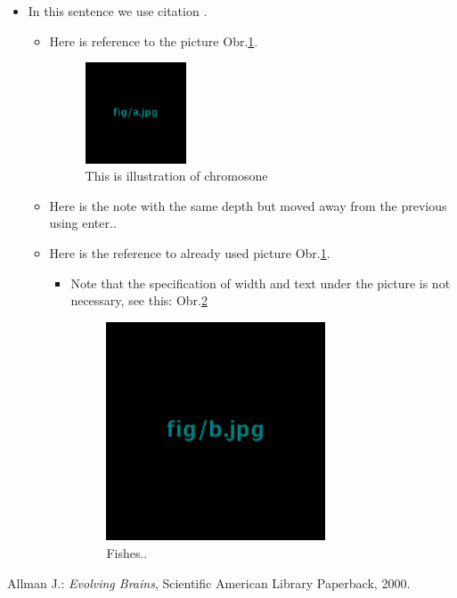 \documentclass[journal,onecolumn]{IEEEtrancz}
\begin{document}
\begin{itemize}
	\item In this sentence we use citation \cite{kniha}.
	\begin{itemize}
		\item Here is reference to the picture Obr.\ref{a}.

		\begin{figure}[ht]
			\centering
				\includegraphics[width=3.0cm]{fig/a.jpg}
			\caption{This is illustration of chromosone}
			\label{a}
		\end{figure}

			\vspace{3mm}
			\vspace{3mm}
		\item Here is the note with the same depth but moved away from the previous using enter..
		\item Here is the reference to already used picture Obr.\ref{a}.
		\begin{itemize}
			\item Note that the specification of width and text under the picture is not necessary, see this: Obr.\ref{b} 

			\begin{figure}[ht]
				\centering
					\includegraphics[width=6.5cm]{fig/b.jpg}
				\caption{ Fishes..}
				\label{b}
			\end{figure}




\end{itemize}
	\end{itemize}
\end{itemize}
\begin{literatura}{1}

Allman J.: \emph{Evolving Brains}, Scientific American Library Paperback, 2000.
\end{literatura}
\end{document}
